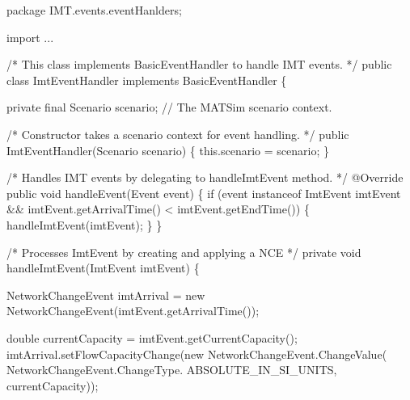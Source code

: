 \documentclass[fancy, oneside, mastersfancy, ms]{byuthesis}
\newenvironment{Shaded}{\begin{snugshade}}{\end{snugshade}}
\newcommand{\AttributeTok}[1]{\textcolor[rgb]{0.40,0.45,0.13}{#1}}
\newcommand{\BuiltInTok}[1]{\textcolor[rgb]{0.00,0.23,0.31}{#1}}
\newcommand{\CommentTok}[1]{\textcolor[rgb]{0.37,0.37,0.37}{#1}}
\newcommand{\ControlFlowTok}[1]{\textcolor[rgb]{0.00,0.23,0.31}{#1}}
\newcommand{\DataTypeTok}[1]{\textcolor[rgb]{0.68,0.00,0.00}{#1}}
\newcommand{\FunctionTok}[1]{\textcolor[rgb]{0.28,0.35,0.67}{#1}}
\newcommand{\ImportTok}[1]{\textcolor[rgb]{0.00,0.46,0.62}{#1}}
\newcommand{\KeywordTok}[1]{\textcolor[rgb]{0.00,0.23,0.31}{#1}}
\newcommand{\NormalTok}[1]{\textcolor[rgb]{0.00,0.23,0.31}{#1}}
\newcommand{\OperatorTok}[1]{\textcolor[rgb]{0.37,0.37,0.37}{#1}}
\begin{document}
\begin{Shaded}
\begin{Highlighting}[]
\KeywordTok{package}\ImportTok{ IMT}\OperatorTok{.}\ImportTok{events}\OperatorTok{.}\ImportTok{eventHanlders}\OperatorTok{;}

\KeywordTok{import} \OperatorTok{...}

\CommentTok{/* This class implements BasicEventHandler to handle IMT events. */}
\KeywordTok{public} \KeywordTok{class}\NormalTok{ ImtEventHandler }\KeywordTok{implements}\NormalTok{ BasicEventHandler }\OperatorTok{\{}

    \KeywordTok{private} \DataTypeTok{final}\NormalTok{ Scenario scenario}\OperatorTok{;} \CommentTok{// The MATSim scenario context.}

\CommentTok{/* Constructor takes a scenario context for event handling. */}
    \KeywordTok{public} \FunctionTok{ImtEventHandler}\OperatorTok{(}\NormalTok{Scenario scenario}\OperatorTok{)} \OperatorTok{\{}
        \KeywordTok{this}\OperatorTok{.}\FunctionTok{scenario} \OperatorTok{=}\NormalTok{ scenario}\OperatorTok{;}
    \OperatorTok{\}}

\CommentTok{/* Handles IMT events by delegating to handleImtEvent method. */}
    \AttributeTok{@Override}
    \KeywordTok{public} \DataTypeTok{void} \FunctionTok{handleEvent}\OperatorTok{(}\BuiltInTok{Event}\NormalTok{ event}\OperatorTok{)} \OperatorTok{\{}
        \ControlFlowTok{if} \OperatorTok{(}\NormalTok{event }\KeywordTok{instanceof}\NormalTok{ ImtEvent imtEvent }\OperatorTok{\&\&} 
\NormalTok{        imtEvent}\OperatorTok{.}\FunctionTok{getArrivalTime}\OperatorTok{()} \OperatorTok{\textless{}}\NormalTok{ imtEvent}\OperatorTok{.}\FunctionTok{getEndTime}\OperatorTok{())} \OperatorTok{\{}
            \FunctionTok{handleImtEvent}\OperatorTok{(}\NormalTok{imtEvent}\OperatorTok{);}
        \OperatorTok{\}}
    \OperatorTok{\}}

\CommentTok{/* Processes ImtEvent by creating and applying a NCE */}
    \KeywordTok{private} \DataTypeTok{void} \FunctionTok{handleImtEvent}\OperatorTok{(}\NormalTok{ImtEvent imtEvent}\OperatorTok{)} \OperatorTok{\{}
    
\NormalTok{        NetworkChangeEvent imtArrival }\OperatorTok{=} 
          \KeywordTok{new} \FunctionTok{NetworkChangeEvent}\OperatorTok{(}\NormalTok{imtEvent}\OperatorTok{.}\FunctionTok{getArrivalTime}\OperatorTok{());}
          
        \DataTypeTok{double}\NormalTok{ currentCapacity }\OperatorTok{=}\NormalTok{ imtEvent}\OperatorTok{.}\FunctionTok{getCurrentCapacity}\OperatorTok{();}
\NormalTok{        imtArrival}\OperatorTok{.}\FunctionTok{setFlowCapacityChange}\OperatorTok{(}\KeywordTok{new} 
\NormalTok{          NetworkChangeEvent}\OperatorTok{.}\FunctionTok{ChangeValue}\OperatorTok{(}
\NormalTok{          NetworkChangeEvent}\OperatorTok{.}\FunctionTok{ChangeType}\OperatorTok{.}
            \FunctionTok{ABSOLUTE\_IN\_SI\_UNITS}\OperatorTok{,}\NormalTok{ currentCapacity}\OperatorTok{));}
          

\end{Highlighting}
\end{Shaded}
\end{document}
